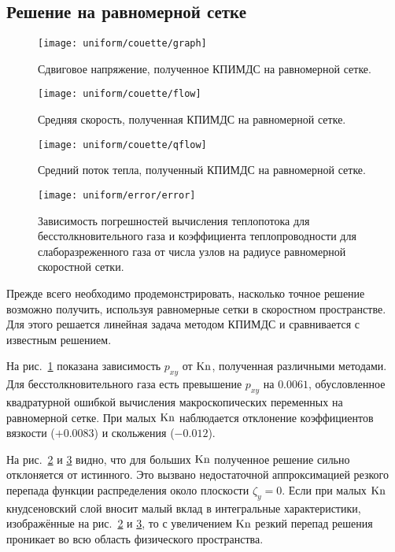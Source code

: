 \subsection{Решение на равномерной сетке}

\begin{figure}
    \centering
    \texttt{[image: uniform/couette/graph]}
    \caption{Сдвиговое напряжение, полученное КПИМДС на равномерной сетке.}
    \label{fig:couette:uniform:shear}
\end{figure}

\begin{figure}
    \centering
    \texttt{[image: uniform/couette/flow]}
    \caption{Средняя скорость, полученная КПИМДС на равномерной сетке.}
    \label{fig:couette:uniform:flow}
\end{figure}

\begin{figure}
    \centering
    \texttt{[image: uniform/couette/qflow]}
    \caption{Средний поток тепла, полученный КПИМДС на равномерной сетке.}
    \label{fig:couette:uniform:qflow}
\end{figure}

\begin{figure}
    \centering
    \texttt{[image: uniform/error/error]}
    \caption{
        Зависимость погрешностей вычисления теплопотока для бесстолкновительного газа
        и коэффициента теплопроводности для слаборазреженного газа
        от числа узлов на радиусе равномерной скоростной сетки.
    }\label{fig:heat:error}
\end{figure}

Прежде всего необходимо продемонстрировать, насколько точное решение возможно получить,
используя равномерные сетки в скоростном пространстве.
Для этого решается линейная задача методом КПИМДС и сравнивается с известным решением.

На рис.~\ref{fig:couette:uniform:shear} показана зависимость \(p_{xy}\) от \(\mathrm{Kn}\), полученная различными методами.
Для бесстолкновительного газа есть превышение \(p_{xy}\) на \(0.0061\),
обусловленное квадратурной ошибкой вычисления макроскопических переменных на равномерной сетке.
При малых \(\mathrm{Kn}\) наблюдается отклонение коэффициентов вязкости (\(+0.0083\)) и скольжения (\(-0.012\)).

На рис.~\ref{fig:couette:uniform:flow} и \ref{fig:couette:uniform:qflow} видно, что для больших \(\mathrm{Kn}\)
полученное решение сильно отклоняется от истинного. Это вызвано недостаточной аппроксимацией
резкого перепада функции распределения около плоскости \(\zeta_y=0\).
Если при малых \(\mathrm{Kn}\) кнудсеновский слой вносит малый вклад в интегральные характеристики,
изображённые на рис.~\ref{fig:couette:uniform:flow} и \ref{fig:couette:uniform:qflow}, то с увеличением \(\mathrm{Kn}\)
резкий перепад решения проникает во всю область физического пространства.

